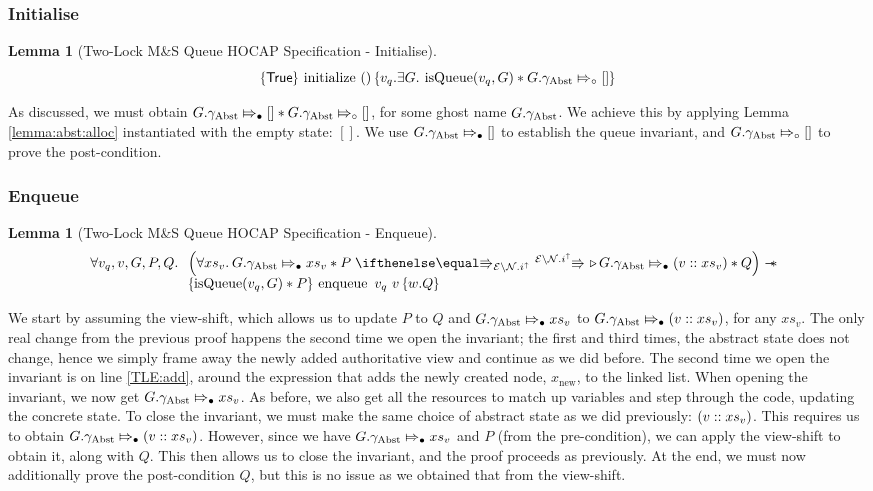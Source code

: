 \documentclass[a4paper, 10pt]{report}
\theoremstyle{definition}
\newtheorem{lemma}[theorem]{Lemma}
\newcommand{\initialise}{\operatorname{initialize}}
\newcommand{\enqueue}{\operatorname{enqueue}}
\newcommand{\msq}{M\&S Queue}
\newcommand{\tlmsq}{Two-Lock \msq{}}
\newcommand{\isqueue}{\operatorname{isQueue}}
\newcommand{\vq}{v_q}
\newcommand{\node}{x}
\newcommand{\nodeN}[1]{\node_{\mathrm{#1}}}
\newcommand{\nodenew}{\nodeN{new}}
\newcommand{\absvalue}{\val}
\newcommand{\absvalueList}{xs_v}
\newcommand{\Qg}{G}
\newcommand{\gabst}{\gname_{\mathrm{Abst}}}
\newcommand{\Nl}{\ensuremath{\mathcal{N}}}
\newcommand{\abstractstatefullfrag}[2]{#1 \Mapsto_{\circ} #2}
\newcommand{\abstractstateauth}[2]{#1 \Mapsto_{\bullet} #2}
\newcommand{\hocapspecinitHTGen}[2]{\hoare{\TRUE}{\initialise \ \TT}{#1 . \Exists #2 . \isqueue(#1, #2) \star{} \abstractstatefullfrag{#2.\gabst}{[]}}}
\newcommand{\hocapspecinitGen}[2]{\hocapspecinitHTGen{#1}{#2}}
\newcommand{\hocapspecinit}{\hocapspecinitGen{\vq}{\Qg}}
\newcommand{\hocapspecenqVS}[5]{\abstractstateauth{#2.\gabst}{#5} \star{} #3 \vs[\mask\setminus\Nl.i^\uparrow] \later \abstractstateauth{#2.\gabst}{(#1 :: #5)} \star{} #4}
\newcommand{\hocapspecenqHT}[5]{\hoare{\isqueue(#1, #3) \star{} #4}{\enqueue \ #1 \ #2}{\valB . #5}}
\newcommand{\hocapspecenqGen}[6]{\All #1, #2, #3, #4, #5.
\begin{array}[t]{l}
\left(\All #6 . \hocapspecenqVS{#2}{#3}{#4}{#5}{#6} \right)
\wand\\
\hocapspecenqHT{#1}{#2}{#3}{#4}{#5}
\end{array}}
\newcommand{\hocapspecenq}{\hocapspecenqGen{\vq}{\absvalue}{\Qg}{P}{Q}{\absvalueList}}
\begin{document}
\subsubsection{Initialise}
\begin{lemma}[\tlmsq{} HOCAP Specification - Initialise]\label{TLMSQ:spec:hocap:initialise}
  \begin{equation*}
    \hocapspecinit
  \end{equation*}
\end{lemma}
As discussed, we must obtain $\abstractstateauth{\Qg.\gabst}{[]} \star{} \abstractstatefullfrag{\Qg.\gabst}{[]}$, for some ghost name $\Qg.\gabst$. We achieve this by applying Lemma \ref{lemma:abst:alloc} instantiated with the empty state: $[]$. We use $\abstractstateauth{\Qg.\gabst}{[]}$ to establish the queue invariant, and $\abstractstatefullfrag{\Qg.\gabst}{[]}$ to prove the post-condition.

\subsubsection{Enqueue}
\begin{lemma}[\tlmsq{} HOCAP Specification - Enqueue]\label{TLMSQ:spec:hocap:enqueue}
  \begin{equation*}
    \hocapspecenq
  \end{equation*}
\end{lemma}
We start by assuming the view-shift, which allows us to update $P$ to $Q$ and $\abstractstateauth{\Qg.\gabst}{\absvalueList}$ to $\abstractstateauth{\Qg.\gabst}{(\absvalue :: \absvalueList)}$, for any $\absvalueList$. The only real change from the previous proof happens the second time we open the invariant; the first and third times, the abstract state does not change, hence we simply frame away the newly added authoritative view and continue as we did before. The second time we open the invariant is on line \ref{TLE:add}, around the expression that adds the newly created node, $\nodenew$, to the linked list. When opening the invariant, we now get $\abstractstateauth{\Qg.\gabst}{\absvalueList}$. As before, we also get all the resources to match up variables and step through the code, updating the concrete state. To close the invariant, we must make the same choice of abstract state as we did previously: $(\absvalue :: \absvalueList)$. This requires us to obtain $\abstractstateauth{\Qg.\gabst}{(\absvalue :: \absvalueList)}$. However, since we have $\abstractstateauth{\Qg.\gabst}{\absvalueList}$ and $P$ (from the pre-condition), we can apply the view-shift to obtain it, along with $Q$. This then allows us to close the invariant, and the proof proceeds as previously. At the end, we must now additionally prove the post-condition $Q$, but this is no issue as we obtained that from the view-shift.
\end{document}
